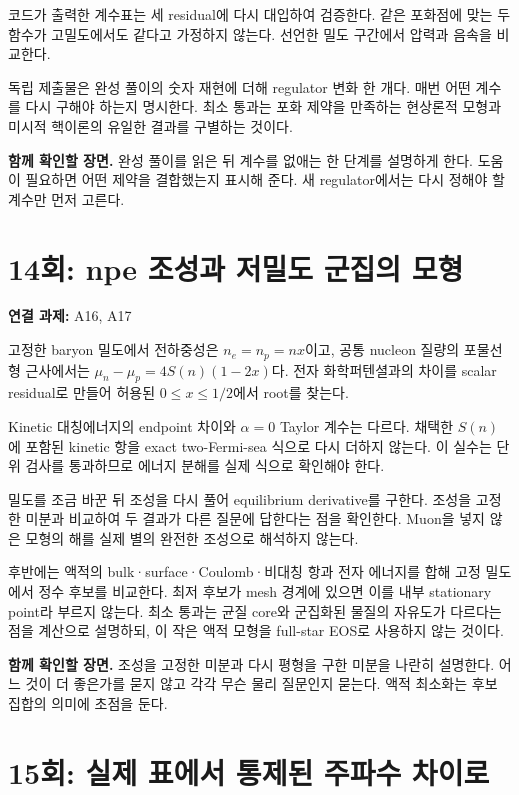 \documentclass[
  10pt,
  a4paper,
]{article}
\begin{document}
코드가 출력한 계수표는 세 residual에 다시 대입하여 검증한다. 같은
포화점에 맞는 두 함수가 고밀도에서도 같다고 가정하지 않는다. 선언한 밀도
구간에서 압력과 음속을 비교한다.

독립 제출물은 완성 풀이의 숫자 재현에 더해 regulator 변화 한 개다. 매번
어떤 계수를 다시 구해야 하는지 명시한다. 최소 통과는 포화 제약을
만족하는 현상론적 모형과 미시적 핵이론의 유일한 결과를 구별하는 것이다.

\textbf{함께 확인할 장면.} 완성 풀이를 읽은 뒤 계수를 없애는 한 단계를
설명하게 한다. 도움이 필요하면 어떤 제약을 결합했는지 표시해 준다. 새
regulator에서는 다시 정해야 할 계수만 먼저 고른다.

\section{14회: npe 조성과 저밀도 군집의
모형}\label{uxd68c-npe-uxc870uxc131uxacfc-uxc800uxbc00uxb3c4-uxad70uxc9d1uxc758-uxbaa8uxd615}

\textbf{연결 과제:} A16, A17

고정한 baryon 밀도에서 전하중성은 \(n_e=n_p=nx\)이고, 공통 nucleon
질량의 포물선형 근사에서는 \(\mu_n-\mu_p=4S(n)(1-2x)\)다. 전자
화학퍼텐셜과의 차이를 scalar residual로 만들어 허용된
\(0\leq x\leq1/2\)에서 root를 찾는다.

Kinetic 대칭에너지의 endpoint 차이와 \(\alpha=0\) Taylor 계수는 다르다.
채택한 \(S(n)\)에 포함된 kinetic 항을 exact two-Fermi-sea 식으로 다시
더하지 않는다. 이 실수는 단위 검사를 통과하므로 에너지 분해를 실제
식으로 확인해야 한다.

밀도를 조금 바꾼 뒤 조성을 다시 풀어 equilibrium derivative를 구한다.
조성을 고정한 미분과 비교하여 두 결과가 다른 질문에 답한다는 점을
확인한다. Muon을 넣지 않은 모형의 해를 실제 별의 완전한 조성으로
해석하지 않는다.

후반에는 액적의 bulk·surface·Coulomb·비대칭 항과 전자 에너지를 합해 고정
밀도에서 정수 후보를 비교한다. 최저 후보가 mesh 경계에 있으면 이를 내부
stationary point라 부르지 않는다. 최소 통과는 균질 core와 군집화된
물질의 자유도가 다르다는 점을 계산으로 설명하되, 이 작은 액적 모형을
full-star EOS로 사용하지 않는 것이다.

\textbf{함께 확인할 장면.} 조성을 고정한 미분과 다시 평형을 구한 미분을
나란히 설명한다. 어느 것이 더 좋은가를 묻지 않고 각각 무슨 물리 질문인지
묻는다. 액적 최소화는 후보 집합의 의미에 초점을 둔다.

\section{15회: 실제 표에서 통제된 주파수
차이로}\label{uxd68c-uxc2e4uxc81c-uxd45cuxc5d0uxc11c-uxd1b5uxc81cuxb41c-uxc8fcuxd30cuxc218-uxcc28uxc774uxb85c}
\end{document}
